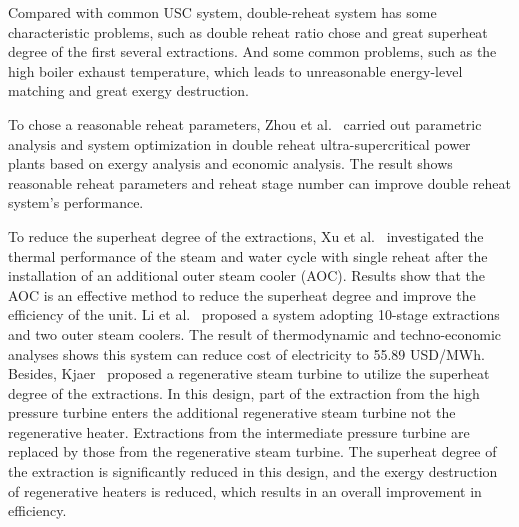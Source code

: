 \documentclass[preprint,12pt]{elsarticle}
\begin{document}
Compared with common USC system, double-reheat system has some characteristic problems, such as double reheat ratio chose and great superheat degree of the first several extractions.
And some common problems, such as the high boiler exhaust temperature, which leads to unreasonable energy-level matching and great exergy destruction. 

To chose a reasonable reheat parameters, Zhou et al.~\cite{Zhou2016Parametric} carried out parametric analysis and system optimization in double reheat ultra-supercritical power plants based on exergy analysis and economic analysis. The result shows reasonable reheat parameters and reheat stage number can improve  double reheat system's performance.


To reduce the superheat degree of the extractions, Xu et al.~\cite{Xu2015Optimum} investigated the thermal performance of the steam and water cycle with single reheat after the installation of an additional outer steam cooler (AOC).
Results show that the AOC is an effective method to reduce the superheat degree and improve the efficiency of the unit.
Li et al.~\cite{Li2014Thermodynamic} proposed a system adopting 10-stage extractions and two outer steam coolers. 
The result of thermodynamic and techno-economic analyses shows this system can reduce cost of electricity to 55.89 USD/MWh.
Besides, Kjaer~\cite{Kjaer2010A} proposed a regenerative steam turbine to utilize the superheat degree of the extractions.
In this design, part of the extraction from the high pressure turbine enters the additional regenerative steam turbine not the regenerative heater.
Extractions from the intermediate pressure turbine are replaced by those from the regenerative steam turbine.
The superheat degree of the extraction is significantly reduced in this design, and the exergy destruction of regenerative heaters is reduced, which results in an overall improvement in efficiency.
\end{document}
